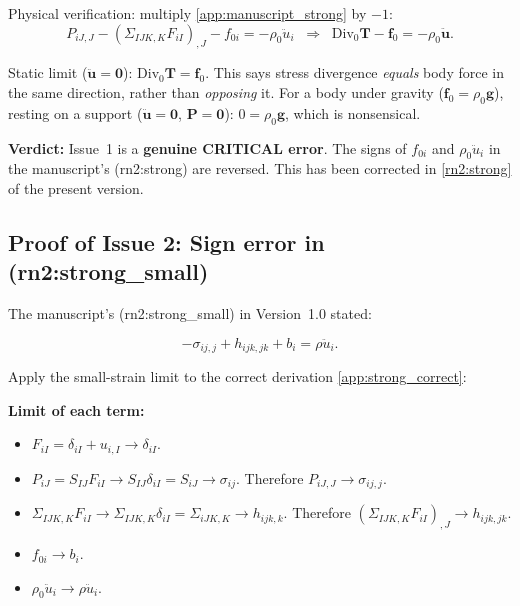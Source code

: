 \documentclass[11pt]{article}
\begin{document}
Physical verification: multiply \eqref{app:manuscript_strong} by $-1$:
\begin{equation}
P_{iJ,J}-(\Sigma_{IJK,K}F_{iI})_{,J}-f_{0i}=-\rho_0\ddot{u}_i
\;\;\Longrightarrow\;\;
\mathrm{Div}_0\mathbf{T}-\mathbf{f}_0=-\rho_0\ddot{\mathbf{u}}.
\end{equation}

Static limit ($\ddot{\mathbf{u}}=\mathbf{0}$): $\mathrm{Div}_0\mathbf{T}=\mathbf{f}_0$. This says stress divergence \emph{equals} body force in the same direction, rather than \emph{opposing} it. For a body under gravity ($\mathbf{f}_0=\rho_0\mathbf{g}$), resting on a support ($\ddot{\mathbf{u}}=\mathbf{0}$, $\mathbf{P}=\mathbf{0}$): $0=\rho_0\mathbf{g}$, which is nonsensical.

\textbf{Verdict:} Issue~1 is a \textbf{genuine CRITICAL error}. The signs of $f_{0i}$ and $\rho_0\ddot{u}_i$ in the manuscript's (rn2:strong) are reversed. This has been corrected in \eqref{rn2:strong} of the present version.

\subsection{Proof of Issue 2: Sign error in (rn2:strong\_small)}
\label{app:proof2}

The manuscript's (rn2:strong\_small) in Version~1.0 stated:

\begin{equation}
-\sigma_{ij,j}+h_{ijk,jk}+b_i=\rho\ddot{u}_i.
\label{app:manuscript_small}
\end{equation}

Apply the small-strain limit to the correct derivation \eqref{app:strong_correct}:

\textbf{Limit of each term:}
\begin{itemize}
\item $F_{iI}=\delta_{iI}+u_{i,I}\to\delta_{iI}$.
\item $P_{iJ}=S_{IJ}F_{iI}\to S_{IJ}\delta_{iI}=S_{iJ}\to\sigma_{ij}$. Therefore $P_{iJ,J}\to\sigma_{ij,j}$.
\item $\Sigma_{IJK,K}F_{iI}\to\Sigma_{IJK,K}\delta_{iI}=\Sigma_{iJK,K}\to h_{ijk,k}$. Therefore $(\Sigma_{IJK,K}F_{iI})_{,J}\to h_{ijk,jk}$.
\item $f_{0i}\to b_i$.
\item $\rho_0\ddot{u}_i\to\rho\ddot{u}_i$.
\end{itemize}
\end{document}
